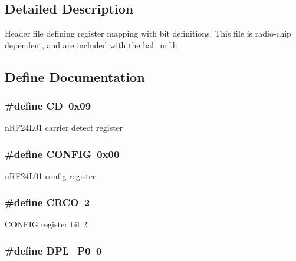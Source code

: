 \subsection{Detailed Description}
Header file defining register mapping with bit definitions. This file is radio-\/chip dependent, and are included with the hal\_\-nrf.h 

\subsection{Define Documentation}
\hypertarget{group__nordic__hal__nrf__reg_ga1050140a3d78b059f809a424e0d9e1c7}{
\subsubsection[{CD}]{\setlength{\rightskip}{0pt plus 5cm}\#define CD~0x09}}
\label{group__nordic__hal__nrf__reg_ga1050140a3d78b059f809a424e0d9e1c7}
nRF24L01 carrier detect register \hypertarget{group__nordic__hal__nrf__reg_ga76ea3cf49247a07c54b3db005a3c7f57}{
\subsubsection[{CONFIG}]{\setlength{\rightskip}{0pt plus 5cm}\#define CONFIG~0x00}}
\label{group__nordic__hal__nrf__reg_ga76ea3cf49247a07c54b3db005a3c7f57}
nRF24L01 config register \hypertarget{group__nordic__hal__nrf__reg_ga253dd73b17f0ea7f71e55f52e796836a}{
\subsubsection[{CRCO}]{\setlength{\rightskip}{0pt plus 5cm}\#define CRCO~2}}
\label{group__nordic__hal__nrf__reg_ga253dd73b17f0ea7f71e55f52e796836a}
CONFIG register bit 2 \hypertarget{group__nordic__hal__nrf__reg_gacf457ec76fbdc9fe3a5d3eb3e9c5dca5}{
\subsubsection[{DPL\_\-P0}]{\setlength{\rightskip}{0pt plus 5cm}\#define DPL\_\-P0~0}}
